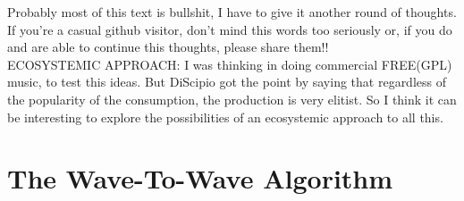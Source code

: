 \documentclass[11pt]{scrartcl} %
\begin{document}
Probably most of this text is bullshit, I have to give it another round of thoughts. If you're a casual github visitor, don't mind this words too seriously or, if you do and are able to continue this thoughts, please share them!!\\

ECOSYSTEMIC APPROACH: I was thinking in doing commercial FREE(GPL) music, to test this ideas. But DiScipio got the point by saying that regardless of the popularity of the consumption, the production is very elitist. So I think it can be interesting to explore the possibilities of an ecosystemic approach to all this.


\vspace{5mm}
\section*{The Wave-To-Wave Algorithm}
\end{document}
